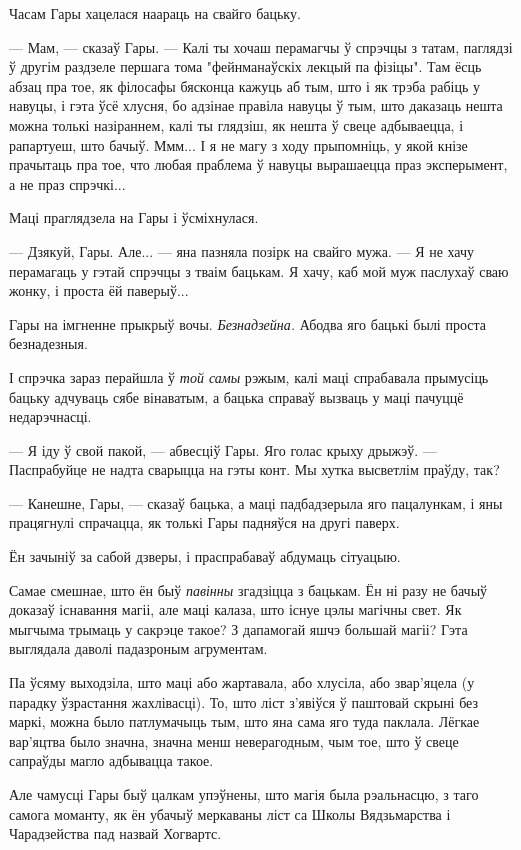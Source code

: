 Часам Гары хацелася наараць на свайго бацьку.

--- Мам, --- сказаў Гары. --- Калі ты хочаш перамагчы ў спрэчцы з татам, паглядзі ў другім
раздзеле першага тома "фейнманаўскіх лекцый па фізіцы". Там ёсць абзац пра тое, як філосафы
бясконца кажуць аб тым, што і як трэба рабіць у навуцы, і гэта ўсё хлусня, бо адзінае правіла
навуцы ў тым, што даказаць нешта можна толькі назіраннем, калі ты глядзіш, як нешта ў свеце
адбываецца, і рапартуеш, што бачыў. Ммм... І я не магу з ходу прыпомніць, у якой кнізе
прачытаць пра тое, что любая праблема ў навуцы вырашаецца праз эксперымент, а не праз
спрэчкі...  

Маці праглядзела на Гары і ўсміхнулася.

--- Дзякуй, Гары. Але... --- яна пазняла позірк на свайго мужа. --- Я не хачу перамагаць у гэтай
спрэчцы з тваім бацькам. Я хачу, каб мой муж паслухаў сваю жонку, і проста ёй паверыў...

Гары на імгненне прыкрыў вочы. \emph{Безнадзейна.} Абодва яго бацькі былі проста безнадезныя.

І спрэчка зараз перайшла ў \emph{той самы} рэжым, калі маці спрабавала прымусіць бацьку адчуваць
сябе вінаватым, а бацька справаў вызваць у маці пачуццё недарэчнасці. 

--- Я іду ў свой пакой, --- абвесціў Гары. Яго голас крыху дрыжэў. --- Паспрабуйце не надта сварыцца
на гэты конт. Мы хутка высветлім праўду, так?

--- Канешне, Гары, --- сказаў бацька, а маці падбадзерыла яго пацалункам, і яны 
працягнулі спрачацца, як толькі Гары падняўся на другі паверх. 

Ён зачыніў за сабой дзверы, і праспрабаваў абдумаць сітуацыю.

Самае смешнае, што ён быў \emph{павінны} згадзіцца з бацькам. Ён ні разу не бачыў доказаў існавання
магіі, але маці калаза, што існуе цэлы магічны свет. Як мыгчыма трымаць у сакрэце такое? З дапамогай
яшчэ большай магіі? Гэта выглядала даволі падазроным агрументам.

Па ўсяму выходзіла, што маці або жартавала, або хлусіла, або звар'яцела (у парадку ўзрастання
жахлівасці). То, што ліст з'явіўся ў паштовай скрыні без маркі, можна было патлумачыць тым, што
яна сама яго туда паклала. Лёгкае вар'яцтва было значна, значна менш неверагодным, чым тое, што
ў свеце сапраўды магло адбывацца такое.

Але чамусці Гары быў цалкам упэўнены, што магія была рэальнасцю, з таго самога моманту, як ён
убачыў меркаваны ліст са Школы Вядзьмарства і Чарадзейства пад назвай Хогвартс.

